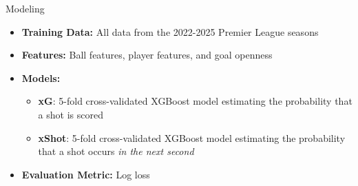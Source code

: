 \documentclass{beamer}
\begin{document}
\begin{frame}{Modeling}
\begin{itemize}
\item \textbf{Training Data:} All data from the 2022-2025 Premier League seasons
\item \textbf{Features:} Ball features, player features, and goal openness
\item \textbf{Models:}
  \begin{itemize}
  \item \textbf{xG}: 5-fold cross-validated XGBoost model estimating the probability that a shot is scored
  \item \textbf{xShot}: 5-fold cross-validated XGBoost model estimating the probability that a shot occurs \emph{in the next second}
  \end{itemize}
\item \textbf{Evaluation Metric:} Log loss
\end{itemize}
\end{frame}
\end{document}
